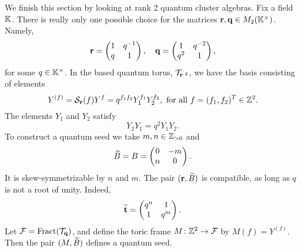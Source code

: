 We finish this section by looking at rank 2 quantum cluster algebras. Fix a field
$\mathbb{K}$. There is really only one possible choice for the matrices $\mathbf{r}, \mathbf{q} \in
	M_2(\mathbb{K}^\times)$. Namely,
\begin{equation*}
	\mathbf{r} = \begin{pmatrix}
		1 & q^{-1} \\
		q & 1
	\end{pmatrix}, \quad
	\mathbf{q} = \begin{pmatrix}
		1   & q^{-2} \\
		q^2 & 1
	\end{pmatrix},
\end{equation*}
%
for some $q \in \mathbb{K}^\times$. In the based quantum torus, $\mathcal{T}_{\mathbf{r}^{\cdot 2}}$, we
have the basis consisting of elements
\begin{equation*}
	Y^{(f)} = \mathcal{S}_{\mathbf{r}}(f)Y^f = q^{f_1f_2}Y_1^{f_1}Y_2^{f_2}, \text{ for all } f = (f_1, f_2)^T \in \mathbb{Z}^2.
\end{equation*}
%
The elements $Y_1$ and $Y_2$ satisfy
\begin{equation*}
	Y_2 Y_1 = q^2 Y_1 Y_2.
\end{equation*}
To construct a quantum seed we take $m,n \in \mathbb{Z}_{> 0}$ and
\begin{equation*}
	\widetilde{B} = B = \begin{pmatrix}
		0 & -m \\
		n & 0
	\end{pmatrix}.
\end{equation*}
%
It is skew-symmetrizable by $n$ and $m$. The pair $(\mathbf{r}, \widetilde{B})$ is compatible, as long
as $q$ is not a root of unity. Indeed,
\begin{equation*}
	\widetilde{\mathbf{t}} = \begin{pmatrix}
		q^n & 1   \\
		1   & q^m
	\end{pmatrix}.
\end{equation*}
%
Let $\mathcal{F} = \operatorname{Fract}(\mathcal{T}_{\mathbf{q}})$, and define the toric frame $M \colon \mathbb{Z}^2 \to \mathcal{F}$
by $M(f) = Y^{(f)}$. Then the pair $(M, \widetilde{B})$ defines a quantum seed.

